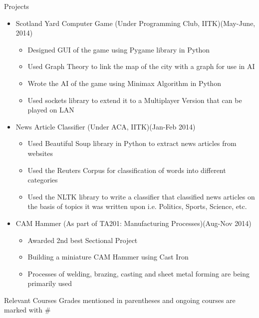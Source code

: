 \documentclass{article}
\begin{document}
\vspace{10pt}
{\Large Projects}
\begin{itemize}
\item {\large Scotland Yard Computer Game}\newline
(Under Programming Club, IITK)\hfill (May-June, 2014)
	\begin{itemize}
	\item Designed GUI of the game using Pygame library in Python
	\item Used Graph Theory to link the map of the city with a graph for use in AI
	\item Wrote the AI of the game using Minimax Algorithm in Python

	\item Used sockets library to extend it to a Multiplayer Version that can be played on LAN
	\end{itemize}
	
\item {\large News Article Classifier}\newline
(Under ACA, IITK)\hfill (Jan-Feb 2014)
	\begin{itemize}
	\item Used Beautiful Soup library in Python to extract news articles from websites
	\item Used the Reuters Corpus for classification of words into different categories
	\item Used the NLTK library to write a classifier that classified news articles on the basis of topics it was written upon i.e. Politics, Sports, Science, etc.
	\end{itemize}
	
\item {\large CAM Hammer}\newline	
(As part of TA201: Manufacturing Processes)\hfill (Aug-Nov 2014)
	\begin{itemize}
	\item Awarded 2nd best Sectional Project
	\item Building a miniature CAM Hammer using Cast Iron
	\item Processes of welding, brazing, casting and sheet metal forming are being primarily used
	\end{itemize}
	\end{itemize}
\vspace{100pt}	
{\Large Relevant Courses}
\newline
Grades mentioned in parentheses and ongoing courses are marked with \#
\end{document}

